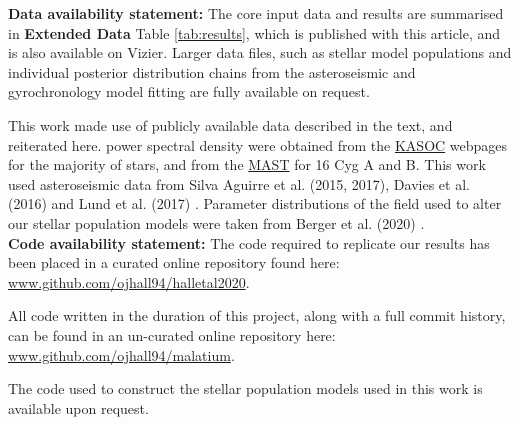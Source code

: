 \textbf{Data availability statement:} The core input data and results are summarised in \textbf{Extended Data} Table \ref{tab:results}, which is published with this article, and is also available on Vizier. Larger data files, such as stellar model populations and individual posterior distribution chains from the asteroseismic and gyrochronology model fitting are fully available on request.

This work made use of publicly available data described in the text, and reiterated here. \kepler power spectral density  were obtained from the \href{http://kasoc.phys.au.dk/}{KASOC} webpages for the majority of stars, and from the \href{https://archive.
		stsci.edu/prepds/kepseismic/}{MAST} for 16 Cyg A and B. This work used asteroseismic data from Silva Aguirre et al. (2015, 2017), Davies et al. (2016) and Lund et al. (2017) \cite{silvaaguirre+2015, davies+2016, lund+2017, silvaaguirre+2017 }. Parameter distributions of the \kepler field used to alter our stellar population models were taken from Berger et al. (2020) \cite{berger+2020}.\\
	
\textbf{Code availability statement:} The code required to replicate our results has been placed in a curated online repository found here: \url{www.github.com/ojhall94/halletal2020}. 

All code written in the duration of this project, along with a full commit history, can be found in an un-curated online repository here: \url{www.github.com/ojhall94/malatium}. 

The code used to construct the stellar population models used in this work is available upon request.




%